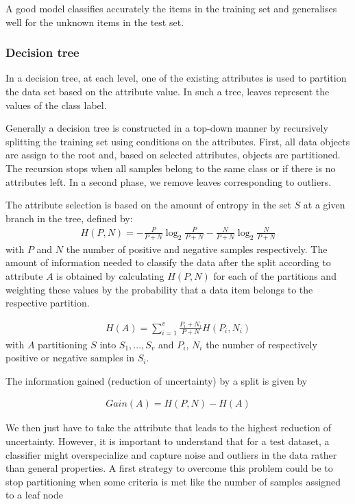 A good model classifies accurately the items in the training set and generalises well for the unknown items in the test set.

\subsubsection*{Decision tree}
In a decision tree, at each level, one of the existing attributes is used to partition the data set based on the attribute value. In such a tree, leaves represent the values of the class label.

Generally a decision tree is constructed in a top-down manner by recursively splitting the training set using conditions on the attributes. First, all data objects are assign to the root and, based on selected attributes, objects are partitioned. The recursion stops when all samples belong to the same class or if there is no attributes left. In a second phase, we remove leaves corresponding to outliers.

The attribute selection is based on the amount of entropy in the set $S$ at a given branch in the tree, defined by:
\begin{align*}
	H(P, N) = - \frac{P}{P + N} \log_2 \frac{P}{P + N} - \frac{N}{P + N} \log_2 \frac{N}{P + N} 
\end{align*}
with $P$ and $N$ the number of positive and negative samples respectively. The amount of information needed to classify the data after the split according to attribute $A$ is obtained by calculating $H(P,N)$ for each of the partitions and weighting these values by the probability that a data item belongs to the respective partition.

\begin{align*}
	H(A) = \sum_{i = 1}^v \frac{P_i + N_i}{P + N} H(P_i, N_i)
\end{align*}
with $A$ partitioning $S$ into $S_1, ..., S_v$ and $P_i$, $N_i$ the number of respectively positive or negative samples in $S_i$.

The information gained (reduction of uncertainty) by a split is given by

\begin{align*}
	Gain(A) = H(P, N) - H(A)
\end{align*}

We then just have to take the attribute that leads to the highest reduction of uncertainty. However, it is important to understand that for a test dataset, a classifier might overspecialize and capture noise and outliers in the data rather than general properties. A first strategy to overcome this problem could be to stop partitioning when some criteria is met like the number of samples assigned to a leaf node

